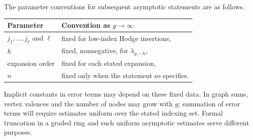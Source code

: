 The parameter conventions for subsequent asymptotic statements are as
follows.
\begin{center}
\begin{tabular}{ll}
Parameter & Convention as $g\to\infty$ \\
\hline
$j_1,\ldots,j_\ell$ and $\ell$ & fixed for low-index Hodge insertions, \\
$h$ & fixed, nonnegative, for $\lambda_{g-h}$, \\
expansion order & fixed for each stated expansion, \\
$n$ & fixed only when the statement so specifies.
\end{tabular}
\end{center}
Implicit constants in error terms may depend on these fixed data.
In graph sums, vertex valences and the number of nodes may grow with
$g$; summation of error terms will require estimates uniform over the
stated indexing set.  Formal truncation in a graded ring and such
uniform asymptotic estimates serve different purposes.
